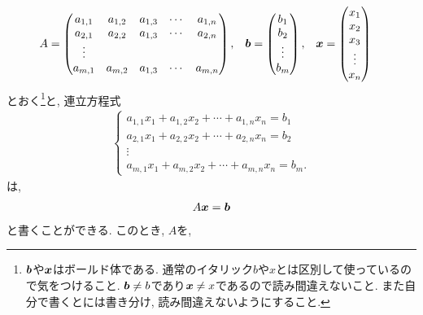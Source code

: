 \begin{align*}
  A&=
  \begin{pmatrix}
    a_{1,1}&a_{1,2}&a_{1,3}&\cdots & a_{1,n}\\
    a_{2,1}&a_{2,2}&a_{1,3}&\cdots & a_{2,n}\\
    \vdots&\\
    a_{m,1}&a_{m,2}&a_{1,3}&\cdots & a_{m,n}
  \end{pmatrix},
  &
  \boldsymbol{b}
  &=
  \begin{pmatrix}
    b_1\\b_2\\\vdots\\b_m
  \end{pmatrix},
  &
  \boldsymbol{x}
  &=
  \begin{pmatrix}
    x_1\\x_2\\x_3\\\vdots\\x_n
  \end{pmatrix}
\end{align*}
とおく\footnote{$\boldsymbol{b}$や$\boldsymbol{x}$はボールド体である.  通常のイタリック$b$や$x$とは区別して使っているので気をつけること.   $\boldsymbol{b}\neq b$であり$\boldsymbol{x}\neq x$であるので読み間違えないこと.  また自分で書くとには書き分け, 読み間違えないようにすること.}と,
連立方程式
\begin{align*}
      \begin{cases}
        a_{1,1}x_1+a_{1,2}x_2+\cdots+a_{1,n}x_n=b_1\\
        a_{2,1}x_1+a_{2,2}x_2+\cdots+a_{2,n}x_n=b_2\\
        \vdots\\
        a_{m,1}x_1+a_{m,2}x_2+\cdots+a_{m,n}x_n=b_m.
    \end{cases}
\end{align*}
は,
\begin{align*}
  A\boldsymbol{x}=\boldsymbol{b}
\end{align*}
と書くことができる.
このとき,
$A$を,
%
%
%
%
%
%
%
%
%
%
%
%
%
%
